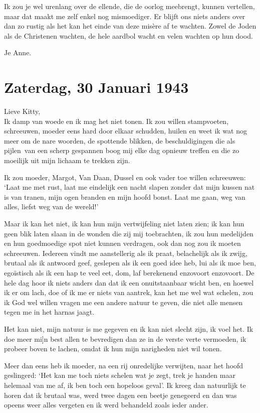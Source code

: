 \documentclass{book}
\begin{document}
Ik zou je wel urenlang over de ellende, die de oorlog meebrengt, kunnen
vertellen, maar dat maakt me zelf enkel nog mismoediger. Er blijft ons niets
anders over dan zo rustig als het kan het einde van deze misère af te wachten.
Zowel de Joden als de Christenen wachten, de hele aardbol wacht en velen wachten
op hun dood.

Je Anne.

\section*{Zaterdag, 30 Januari 1943}

Lieve Kitty,\\
Ik damp van woede en ik mag het niet tonen. Ik zou willen
stampvoeten, schreeuwen, moeder eens hard door elkaar schudden, huilen en weet
ik wat nog meer om de nare woorden, de spottende blikken, de beschuldigingen die
als pijlen~van een scherp gespannen boog mij elke dag opnieuw treffen en die zo
moeilijk uit mijn lichaam te trekken zijn.

Ik zou moeder, Margot, Van Daan, Dussel en ook vader toe willen schreeuwen:
`Laat me met rust, laat me eindelijk een nacht slapen zonder dat mijn kussen nat
is van tranen, mijn ogen branden en mijn hoofd bonst. Laat me gaan, weg van
alles, liefst weg van de wereld!'

Maar ik kan het niet, ik kan hun mijn vertwijfeling niet laten zien; ik kan hun
geen blik laten slaan in de wonden die zij mij toebrachten, ik zou hun
medelijden en hun goedmoedige spot niet kunnen verdragen, ook dan nog zou ik
moeten schreeuwen. Iedereen vindt me aanstellerig als ik praat, belachelijk als
ik zwijg, brutaal als ik antwoord geef, geslepen als ik een goed idee heb, lui
als ik moe ben, egoïstisch als ik een hap te veel eet, dom, laf berekenend
enzovoort enzovoort. De hele dag hoor ik niets anders dan dat ik een
onuitstaanbaar wicht ben, en hoewel ik er om lach, doe of ik me er niets van
aantrek, kan het me wel wat schelen, zou ik God wel willen vragen me een andere
natuur te geven, die niet alle mensen tegen me in het harnas jaagt.

Het kan niet, mijn natuur is me gegeven en ik kan niet slecht zijn, ik voel het.
Ik doe meer mi{]}n best allen te bevredigen dan ze in de verste verte vermoeden,
ik probeer boven te lachen, omdat ik hun mijn narigheden niet wil tonen.

Meer dan eens heb ik moeder, na een rij onredelijke verwijten, naar het hoofd
geslingerd: `Het kan me toch niets schelen wat je zegt, trek je handen maar
helemaal van me af, ik ben toch een hopeloos geval'. Ik kreeg dan natuurlijk te
horen dat ik brutaal was, werd twee dagen een beetje genegeerd en dan was opeens
weer alles vergeten en ik werd behandeld zoals ieder ander.
\end{document}
